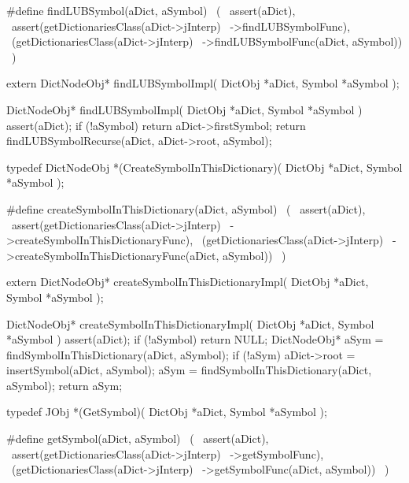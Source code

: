 #define findLUBSymbol(aDict, aSymbol)           \
  (                                             \
    assert(aDict),                              \
    assert(getDictionariesClass(aDict->jInterp) \
      ->findLUBSymbolFunc),                     \
    (getDictionariesClass(aDict->jInterp)       \
      ->findLUBSymbolFunc(aDict, aSymbol))      \
  )
\stopCHeader

\setCHeaderStream{private}
\startCHeader
extern DictNodeObj* findLUBSymbolImpl(
  DictObj *aDict,
  Symbol  *aSymbol
);
\stopCHeader
\setCHeaderStream{public}

\startCCode
DictNodeObj* findLUBSymbolImpl(
  DictObj *aDict,
  Symbol  *aSymbol
) {
  assert(aDict);
  if (!aSymbol) return aDict->firstSymbol;
  return findLUBSymbolRecurse(aDict, aDict->root, aSymbol);
}
\stopCCode
\stopTestSuite

\startTestSuite[createSymbol]

\startCHeader
typedef DictNodeObj *(CreateSymbolInThisDictionary)(
  DictObj *aDict,
  Symbol  *aSymbol
);

#define createSymbolInThisDictionary(aDict, aSymbol)      \
        (                                                 \
    assert(aDict),                                        \
    assert(getDictionariesClass(aDict->jInterp)           \
      ->createSymbolInThisDictionaryFunc),                \
    (getDictionariesClass(aDict->jInterp)                 \
      ->createSymbolInThisDictionaryFunc(aDict, aSymbol)) \
  )
\stopCHeader

\startCHeader
extern DictNodeObj* createSymbolInThisDictionaryImpl(
  DictObj *aDict,
  Symbol  *aSymbol
);
\stopCHeader
\setCHeaderStream{public}

\startCCode
DictNodeObj* createSymbolInThisDictionaryImpl(
  DictObj *aDict,
  Symbol  *aSymbol
) {
  assert(aDict);
  if (!aSymbol) return NULL;
  DictNodeObj* aSym =
    findSymbolInThisDictionary(aDict, aSymbol);
  if (!aSym) {
    aDict->root = insertSymbol(aDict, aSymbol);
    aSym = findSymbolInThisDictionary(aDict, aSymbol);
  }
  return aSym;
}
\stopCCode
\stopTestSuite

\startTestSuite[getSymbol]

\startCHeader
typedef JObj *(GetSymbol)(
  DictObj *aDict,
  Symbol  *aSymbol
);

#define getSymbol(aDict, aSymbol)               \
  (                                             \
    assert(aDict),                              \
    assert(getDictionariesClass(aDict->jInterp) \
      ->getSymbolFunc),                         \
    (getDictionariesClass(aDict->jInterp)       \
      ->getSymbolFunc(aDict, aSymbol))          \
  )
\stopCHeader

